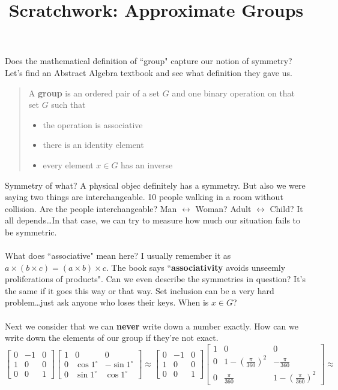 \documentclass[12pt]{article}
\title{Scratchwork: Approximate Groups}
\date{}
\begin{document}
\sffamily

\maketitle

\noindent Does the mathematical definition of ``group" capture our notion of symmetry? Let's find an Abstract Algebra textbook and see what definition they gave us.
\begin{quotation}
A \textbf{group} is an ordered pair of a set $G$ and one binary operation on that set $G$ such that 
\begin{itemize}
\item the operation is associative 
\item there is an identity element
\item every element $x \in G$ has an inverse
\end{itemize}
\end{quotation} 
Symmetry of what?  A physical objec definitely has a symmetry.  But also we were saying two things are interchangeable.  10 people walking in a room without collision.  Are the people interchangeable?  Man $\leftrightarrow$ Woman? Adult $\leftrightarrow$ Child? It all depends\dots In that case, we can try to measure how much our situation fails to be symmetric. \\ \\
What does ``associative" mean here?  I usually remember it as $a \times (b \times c) = (a \times b) \times c$.  The book says ``\textbf{associativity} avoids unseemly proliferations of products".  Can we even describe the symmetries in question?  It's the same if it goes this way or that way.  Set inclusion can be a very hard problem\dots just ask anyone who loses their keys.  When is $x \in G$?\\ \\
\noindent Next we consider that we can \textbf{never} write down a number exactly.  How can we write down the elements of our group if they're not exact.
$$ \left[\begin{array}{rrr} 
0 & -1 & 0 \\ 
1 & 0 & 0 \\
0 & 0 & 1\end{array} \right]\left[ 
\begin{array}{rrr}
1 & 0 & 0 \\
0 & \cos 1^\circ & -\sin 1^\circ \\
0 & \sin 1^\circ & \cos 1^\circ \end{array}\right] \approx 
\left[\begin{array}{rrr} 
0 & -1 & 0 \\ 
1 & 0 & 0 \\
0 & 0 & 1\end{array} \right]\left[ 
\begin{array}{rrr}
1 & 0\;\;\;\;\, & 0\;\;\;\;\, \\
0 & 1 - (\frac{\pi}{360})^2 & -\frac{\pi}{360}\;\;\; \\
0 & \frac{\pi}{360}\;\;\; & 1 - (\frac{\pi}{360})^2\end{array}\right]
\approx 
$$
\end{document}
